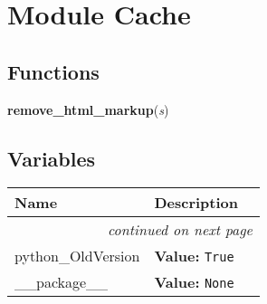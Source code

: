 %
%
%


\section{Module Cache}

    \label{Cache}


  \subsection{Functions}

    \label{Cache:remove_html_markup}

    \vspace{0.5ex}

\hspace{.8\funcindent}\begin{boxedminipage}{\funcwidth}

    \raggedright \textbf{remove\_html\_markup}(\textit{s})

\setlength{\parskip}{2ex}
\setlength{\parskip}{1ex}
    \end{boxedminipage}



  \subsection{Variables}

    \vspace{-1cm}
\hspace{\varindent}\begin{longtable}{|p{\varnamewidth}|p{\vardescrwidth}|l}
\cline{1-2}
\cline{1-2} \centering \textbf{Name} & \centering \textbf{Description}& \\
\cline{1-2}
\endhead\cline{1-2}\multicolumn{3}{r}{\small\textit{continued on next page}}\\\endfoot\cline{1-2}
\endlastfoot\raggedright p\-y\-t\-h\-o\-n\-\_\-O\-l\-d\-V\-e\-r\-s\-i\-o\-n\- & \raggedright \textbf{Value:} 
{\tt True}&\\
\cline{1-2}
\raggedright \_\-\_\-p\-a\-c\-k\-a\-g\-e\-\_\-\_\- & \raggedright \textbf{Value:} 
{\tt None}&\\
\cline{1-2}
\end{longtable}


